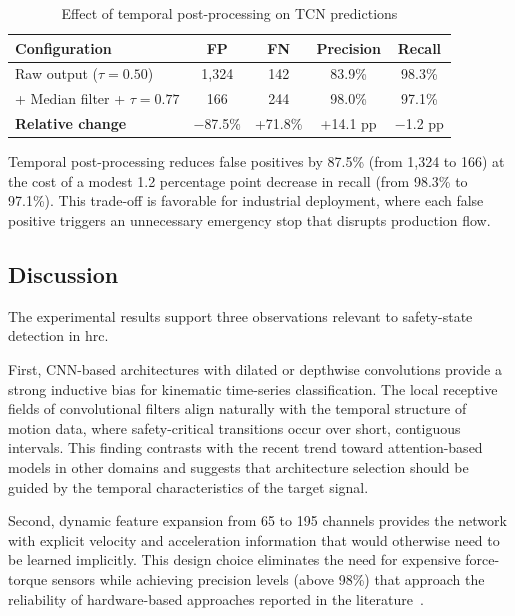 \documentclass[3p,times,procedia]{elsarticle}
\begin{document}
\begin{table}[h!]
\caption{Effect of temporal post-processing on TCN predictions}
\label{tab:postprocess}
\centering
\footnotesize
\setlength{\tabcolsep}{4pt}
\begin{tabular}{@{}lcccc@{}}
\toprule
\textbf{Configuration} & \textbf{FP} & \textbf{FN} & \textbf{Precision} & \textbf{Recall} \\
\midrule
Raw output ($\tau = 0.50$)       & 1,324 & 142  & 83.9\% & 98.3\% \\
+ Median filter + $\tau = 0.77$  & 166   & 244  & 98.0\% & 97.1\% \\
\midrule
\textbf{Relative change}         & $-$87.5\% & +71.8\% & +14.1 pp & $-$1.2 pp \\
\bottomrule
\end{tabular}
\end{table}

Temporal post-processing reduces false positives by 87.5\% (from 1,324 to 166) at the cost of a modest 1.2 percentage point decrease in recall (from 98.3\% to 97.1\%). This trade-off is favorable for industrial deployment, where each false positive triggers an unnecessary emergency stop that disrupts production flow.

\subsection{Discussion}

The experimental results support three observations relevant to safety-state detection in \ac{hrc}.

First, CNN-based architectures with dilated or depthwise convolutions provide a strong inductive bias for kinematic time-series classification. The local receptive fields of convolutional filters align naturally with the temporal structure of motion data, where safety-critical transitions occur over short, contiguous intervals. This finding contrasts with the recent trend toward attention-based models in other domains and suggests that architecture selection should be guided by the temporal characteristics of the target signal.

Second, dynamic feature expansion from 65 to 195 channels provides the network with explicit velocity and acceleration information that would otherwise need to be learned implicitly. This design choice eliminates the need for expensive force-torque sensors while achieving precision levels (above 98\%) that approach the reliability of hardware-based approaches reported in the literature~\cite{wang2025sixdof}.
\end{document}
